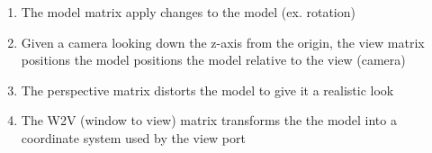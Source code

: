  \begin{enumerate}
    \item The model matrix apply changes to the model (ex. rotation)
    \item Given a camera looking down the z-axis from the origin,
    the view matrix positions the model positions the model relative to the
    view (camera)
    \item The perspective matrix distorts the model to give it a realistic
    look
    \item The W2V (window to view) matrix transforms the the model into a
    coordinate system used by the view port
  \end{enumerate}
